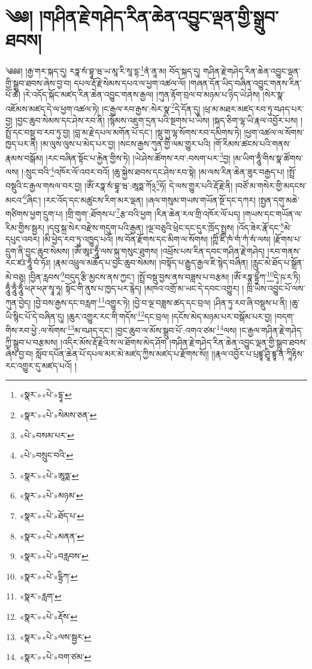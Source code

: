 \chapter{༄༅། །གཤིན་རྗེ་གཤེད་རིན་ཆེན་འབྱུང་ལྡན་གྱི་སྒྲུབ་ཐབས།}༄༅༅། །རྒྱ་གར་སྐད་དུ། རཏྣ་སཾ་བྷཱ་ཝ་ཡ་མཱ་རི་སཱ་དྷ་\footnote{«སྣར་»«པེ་»དྷཱ་}ནཾ་ནཱ་མ། བོད་སྐད་དུ། གཤིན་རྗེ་གཤེད་རིན་ཆེན་འབྱུང་ལྡན་གྱི་སྒྲུབ་ཐབས་ཞེས་བྱ་བ། དཔལ་རྡོ་རྗེ་སེམས་དཔའ་ལ་ཕྱག་འཚལ་ལོ། །གཞན་དོན་ཡིད་བཞིན་འབྱུང་གནས་རིན་པོ་ཆེ། །རེ་འདོད་སྐོང་མཛད་རིན་ཆེན་འབྱུང་གནས་རྒྱལ། །ཀུན་རྟོག་བྲལ་བ་མཉམ་པ་ཉིད་ཡེ་ཤེས། །སེར་སྣ་འཇོམས་མཛད་དེ་ལ་ཕྱག་འཚལ་ཏེ། །ང་རྒྱལ་རབ་རྒྱས་:སེར་སྣ་\footnote{«སྣར་»«པེ་»སེམས་ཅན་}དེ་དོན་དུ། །ཕྲ་མ་མཐར་མཛད་རབ་ཏུ་བཤད་པར་བྱ། །བྱང་ཆུབ་སེམས་དང་ཤེས་རབ་ནི། །སྙོམས་འཇུག་དྲན་པའི་སྔགས་པ་ཡིས། །སྐད་ཅིག་ལྷ་ཡི་རྣལ་འབྱོར་པས། །སྤྲོ་དང་བསྡུ་བ་རབ་ཏུ་བྱ། །བླ་མ་རྗེ་དཔལ་མགོན་པོ་དང་། །སྡུ་གུ་ལྷ་སོགས་རབ་དམིགས་ཏེ། །ཕྱག་འཚལ་ལ་སོགས་ཁྱད་པར་ནི། །མ་ལུས་ལུས་པ་མེད་པར་བྱ། །སངས་རྒྱས་ཀུན་གྱི་ལམ་གྱུར་པའི། །གོ་རིམས་ཚངས་པའི་གནས་རྣམས་བསྒོམ། །རང་བཞིན་སྟོང་པ་རྐྱེན་གྱིས་ཏེ། །ཡེ་ཤེས་ཚོགས་རབ་:བསག་པར་\footnote{«པེ་»བསམ་པར་}བྱ། །མ་ཡིག་ཧཱུྃ་གིས་སྣ་ཚོགས་ལས། །:སྲུང་བའི་\footnote{«པེ་»བསྲུང་བའི་}འཁོར་ལོ་འབར་བའོ། །ཆུ་སྐྱེས་ཐབས་དང་ཤེས་རབ་སྟེ། །མ་ལས་རིན་ཆེན་ཟུར་བརྒྱད་པ། །སྤྲོ་བསྡུའི་ང་རྒྱལ་གསལ་བར་བྱ། །ཨོཾ་རཏྣ་སཾ་བྷཱ་ཝ་:ཨཱཏྨ་ཀོ྅\footnote{«སྣར་»«པེ་»ཨཱཏྨ་}ཧོ། དེ་ལས་གྱུར་པའི་རྡོ་རྗེ་ནི། །བཙོ་མ་གསེར་གྱི་མདངས་མངའ་\footnote{«སྣར་»«པེ་»མཉམ་}ཞིང་། །རང་འོད་དང་མཚུངས་རིག་མར་ལྡན། །ཞལ་གསུམ་གཡས་གཡོན་སྔོ་དང་དཀར། །སྤྱན་དགུ་མཆེ་གཙིགས་ཕྱག་དྲུག་པ། །གྲི་གུག་:ཐོགས་པ་\footnote{«སྣར་»«པེ་»ཐོད་པ་}རྩ་བའི་ཕྱག །རིན་ཆེན་རལ་གྲི་འཁོར་ལོ་པད། །གཡས་དང་གཡོན་ལ་རིམ་གྱིས་སྦྱར། །དབུ་སྐྲ་སེར་བརྫེས་གདུག་པའི་རྒྱན། །ལྔ་བཅུའི་ཕྲེང་དང་དུར་ཁྲོད་སྤྲས། །འོད་ཟེར་རྣོ་དང་\footnote{«སྣར་»«པེ་»མནན་}མེ་དཔུང་འབར། །མི་ཕྱེད་རབ་ཏུ་འཁྱུད་པའོ། །ས་བོན་རྫོགས་དང་མིག་ལ་སོགས། །ཀྵིཾ་ཛིཾ་ཁཾ་གཾ་ཀཾ་སཾ་ལས། །རྫོགས་པ་དྲུག་ནི་བྱང་ཆུབ་སེམས། །ཨོཾ་ཨཱཿ་ཧཱུྃ་ལས་སྐུ་གསུང་ཐུགས། །འཕྲོས་པས་རིན་དབང་གཤིན་རྗེ་གཤེད། །རབ་གནས་རང་ཛཿ་ཧཱུྃ་བཾ་ཧོཿ། །རྣམ་འཕྲུལ་མཆོད་པ་བྱང་ཆུབ་སེམས། །བསྟོད་པ་རྒྱུད་རྒྱལ་ཇི་སྙེད་བཞིན། །རླུང་མེ་ཐོད་པ་སྒྲོན་མེ་བཅུ། །བྱིན་རླབས་\footnote{«སྣར་»«པེ་»བརླབས་}བདུད་རྩི་མྱངས་ནས་ཀྱང་། །སྤྲོ་བསྡུ་བྱས་ནས་བཟླས་པ་བརྩམ། །ཨོཾ་རཏྣ་དྷྲྀཀ་\footnote{«སྣར་»«པེ་»དྷྲིཀ་}དྭེ་ཥ་ར་ཏི། ཧཱུྃ་ཧཱུྃ་ཧཱུྃ་ཕཊ་ཕཊ་སྭཱ་ཧཱ། སྟོང་གི་ནུས་པ་ཁྱད་པར་རྙེད། །མཁའ་འགྲོ་མ་ཡང་དེ་དབང་འགྱུར། །
ཁྲི་ཡིས་འབྱུང་པོ་ལས་ཀུན་བྱེད། །བྱེ་བས་རྒྱས་དང་བརླག་\footnote{«སྣར་»རླག་}འགྱུར་ཏེ། །བྱེ་བ་ལྔ་བཟླས་ཚད་དང་བྲལ། །ཤིན་ཏུ་རབ་ཞི་བསྡུས་པ་ནི། །ཆུ་ཡི་སྙིང་པོ་དེ་བཞིན་དུ། །ཆུར་འགྱུར་རང་གི་གདོས་\footnote{«སྣར་»«པེ་»རྡོས་}དང་བྲལ། །དངོས་མེད་མཉམ་པར་བསྒོམ་པར་བྱ། །བདག་གིས་རབ་ཕྱེ་:ལ་སོགས་\footnote{«སྣར་»«པེ་»ལས་སྦྱར་}མ་བཤད་དང་། །བྱང་ཆུབ་ལ་མོས་སྒྲུབ་པོ་:འགའ་ཙམ་\footnote{«སྣར་»«པེ་»བག་ཙམ་}ལས། །ང་རྒྱལ་གཤིན་རྗེ་གཤེད་ཀྱི་སྒྲུབ་པ་བརྩམས། །འདིར་མོས་རྡོ་རྗེའི་ས་ལ་ཐོགས་མེད་ཤོག །གཤིན་རྗེ་གཤེད་རིན་ཆེན་འབྱུང་ལྡན་གྱི་སྒྲུབ་ཐབས་ཞེས་བྱ་བ། སློབ་དཔོན་ཆེན་པོ་དཔལ་མར་མེ་མཛད་ཀྱིས་མཛད་པ་རྫོགས་སོ།། །།རྣལ་འབྱོར་པ་པྲཛྙཱ་ཤྲཱི་ཛྙཱ་ན་ཀཱིརྟིས་རང་འགྱུར་དུ་མཛད་པའོ། ། 